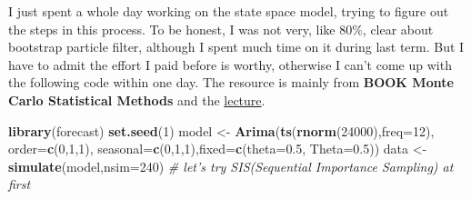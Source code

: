 \documentclass[]{article}
\newenvironment{Shaded}{\begin{snugshade}}{\end{snugshade}}
\newcommand{\CommentTok}[1]{\textcolor[rgb]{0.56,0.35,0.01}{\textit{#1}}}
\newcommand{\DataTypeTok}[1]{\textcolor[rgb]{0.13,0.29,0.53}{#1}}
\newcommand{\DecValTok}[1]{\textcolor[rgb]{0.00,0.00,0.81}{#1}}
\newcommand{\FloatTok}[1]{\textcolor[rgb]{0.00,0.00,0.81}{#1}}
\newcommand{\KeywordTok}[1]{\textcolor[rgb]{0.13,0.29,0.53}{\textbf{#1}}}
\newcommand{\NormalTok}[1]{#1}
\newcommand{\StringTok}[1]{\textcolor[rgb]{0.31,0.60,0.02}{#1}}
\begin{document}
I just spent a whole day working on the state space model, trying to
figure out the steps in this process. To be honest, I was not very, like
80\%, clear about bootstrap particle filter, although I spent much time
on it during last term. But I have to admit the effort I paid before is
worthy, otherwise I can't come up with the following code within one
day. The resource is mainly from \textbf{BOOK Monte Carlo Statistical
Methods} and the
\href{https://onlinelibrary.wiley.com/doi/abs/10.1111/1467-842X.00104}{lecture}.

\begin{Shaded}
\begin{Highlighting}[]
\KeywordTok{library}\NormalTok{(forecast)}
\KeywordTok{set.seed}\NormalTok{(}\DecValTok{1}\NormalTok{)}
\NormalTok{model <-}\StringTok{ }\KeywordTok{Arima}\NormalTok{(}\KeywordTok{ts}\NormalTok{(}\KeywordTok{rnorm}\NormalTok{(}\DecValTok{24000}\NormalTok{),}\DataTypeTok{freq=}\DecValTok{12}\NormalTok{), }\DataTypeTok{order=}\KeywordTok{c}\NormalTok{(}\DecValTok{0}\NormalTok{,}\DecValTok{1}\NormalTok{,}\DecValTok{1}\NormalTok{), }\DataTypeTok{seasonal=}\KeywordTok{c}\NormalTok{(}\DecValTok{0}\NormalTok{,}\DecValTok{1}\NormalTok{,}\DecValTok{1}\NormalTok{),}\DataTypeTok{fixed=}\KeywordTok{c}\NormalTok{(}\DataTypeTok{theta=}\FloatTok{0.5}\NormalTok{, }\DataTypeTok{Theta=}\FloatTok{0.5}\NormalTok{))}
\NormalTok{data <-}\StringTok{ }\KeywordTok{simulate}\NormalTok{(model,}\DataTypeTok{nsim=}\DecValTok{240}\NormalTok{)}
\CommentTok{# let's try SIS(Sequential Importance Sampling) at first}
\end{Highlighting}
\end{Shaded}
\end{document}
